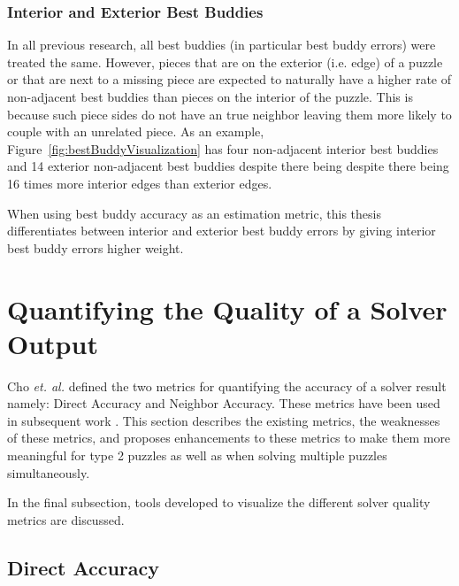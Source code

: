 \documentclass{report}
\begin{document}
\subsubsection{Interior and Exterior Best Buddies}\label{sec:interiorExteriorBestBuddies}

In all previous research, all best buddies (in particular best buddy errors) were treated the same.  However, pieces that are on the exterior (i.e. edge) of a puzzle or that are next to a missing piece are expected to naturally have a higher rate of non-adjacent best buddies than pieces on the interior of the puzzle.  This is because such piece sides do not have an true neighbor leaving them more likely to couple with an unrelated piece.  As an example, Figure~\ref{fig:bestBuddyVisualization} has four non-adjacent interior best buddies and 14 exterior non-adjacent best buddies despite there being despite there being 16 times more interior edges than exterior edges. 

When using best buddy accuracy as an estimation metric, this thesis differentiates between interior and exterior best buddy errors by giving interior best buddy errors higher weight.







\pagebreak
\section{Quantifying the Quality of a Solver Output}\label{sec:quantifyingSolverQuantify}

Cho \textit{et. al.} \cite{cho2010} defined the two metrics for quantifying the accuracy of a solver result namely: Direct Accuracy and Neighbor Accuracy. These metrics have been used in subsequent work \cite{sholomon2013, pomeranz2011, paikin2015, son2014, gallagher2012}.  This section describes the existing metrics, the weaknesses of these metrics, and proposes enhancements to these metrics to make them more meaningful for type 2 puzzles as well as when solving multiple puzzles simultaneously.

In the final subsection, tools developed to visualize the different solver quality metrics are discussed.

\subsection{Direct Accuracy}\label{sec:directAccuracy}
\end{document}
